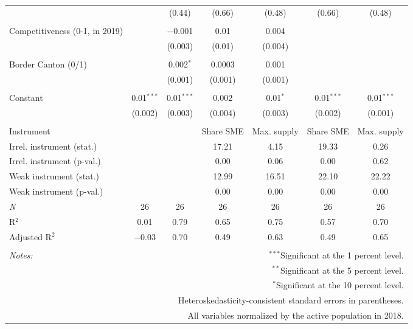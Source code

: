 \begin{table}[!htbp]
\begin{tabular}{@{\extracolsep{5pt}}lcccccc}
  &  & (0.44) & (0.66) & (0.48) & (0.66) & (0.48) \\ 
  & & & & & & \\ 
 \multirow{2}{4.5cm}{Competitiveness (0-1, in 2019)} &  & $-$0.001 & 0.01 & 0.004 &  &  \\ 
  &  & (0.003) & (0.01) & (0.004) &  &  \\ 
  & & & & & & \\ 
 \multirow{2}{4.5cm}{Border Canton (0/1)} &  & 0.002$^{*}$ & 0.0003 & 0.001 &  &  \\ 
  &  & (0.001) & (0.001) & (0.001) &  &  \\ 
  & & & & & & \\ 
 Constant & 0.01$^{***}$ & 0.01$^{***}$ & 0.002 & 0.01$^{*}$ & 0.01$^{***}$ & 0.01$^{***}$ \\ 
  & (0.002) & (0.003) & (0.004) & (0.003) & (0.002) & (0.001) \\ 
  & & & & & & \\ 
Instrument &  &  & Share SME & Max. supply & Share SME & Max. supply \\ 
Irrel. instrument (stat.) &  &  & 17.21 &  4.15 & 19.33 &  0.26 \\ 
Irrel. instrument (p-val.) &  &  & 0.00 & 0.06 & 0.00 & 0.62 \\ 
Weak instrument (stat.) &  &  & 12.99 & 16.51 & 22.10 & 22.22 \\ 
Weak instrument (p-val.) &  &  & 0.00 & 0.00 & 0.00 & 0.00 \\ 
\textit{N} & 26 & 26 & 26 & 26 & 26 & 26 \\ 
R$^{2}$ & 0.01 & 0.79 & 0.65 & 0.75 & 0.57 & 0.70 \\ 
Adjusted R$^{2}$ & $-$0.03 & 0.70 & 0.49 & 0.63 & 0.49 & 0.65 \\ 
\hline 
\hline \\[-1.8ex] 
\textit{Notes:} & \multicolumn{6}{r}{$^{***}$Significant at the 1 percent level.} \\ 
 & \multicolumn{6}{r}{$^{**}$Significant at the 5 percent level.} \\ 
 & \multicolumn{6}{r}{$^{*}$Significant at the 10 percent level.} \\ 
 & \multicolumn{6}{r}{Heteroskedasticity-consistent standard errors in parentheses.} \\ 
 & \multicolumn{6}{r}{All variables normalized by the active population in 2018.} \\ 
\end{tabular} 
\end{table} 
